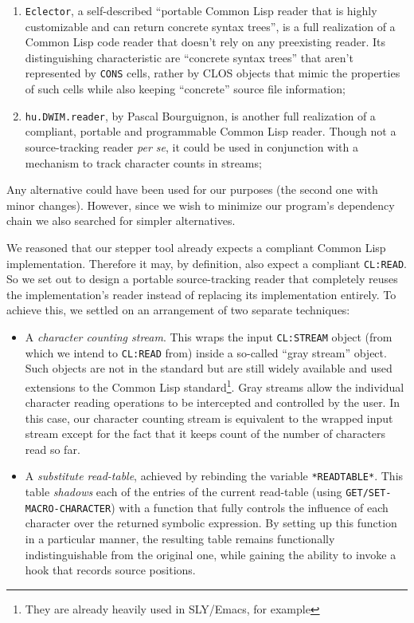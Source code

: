 \documentclass[format=sigconf]{acmart}
\begin{document}
\begin{enumerate}
\item \texttt{Eclector}\cite{eclector}, a self-described ``portable
  Common Lisp reader that is highly customizable and can return
  concrete syntax trees'', is a full realization of a Common Lisp code
  reader that doesn't rely on any preexisting reader.  Its
  distinguishing characteristic are ``concrete syntax trees'' that
  aren't represented by \texttt{CONS} cells, rather by CLOS objects
  that mimic the properties of such cells while also keeping
  ``concrete'' source file information;

\item \texttt{hu.DWIM.reader}\cite{bourguignon-reader}, by Pascal
  Bourguignon, is another full realization of a compliant, portable
  and programmable Common Lisp reader.  Though not a source-tracking
  reader \emph{per se}, it could be used in conjunction with a
  mechanism to track character counts in streams;
\end{enumerate}

Any alternative could have been used for our purposes (the second one
with minor changes).  However, since we wish to minimize our program's
dependency chain we also searched for simpler alternatives.

We reasoned that our stepper tool already expects a compliant Common
Lisp implementation.  Therefore it may, by definition, also expect a
compliant \texttt{CL:READ}.  So we set out to design a portable
source-tracking reader that completely reuses the implementation's
reader instead of replacing its implementation entirely.  To achieve
this, we settled on an arrangement of two separate techniques:

\begin{itemize}
\item A \emph{character counting stream}.  This wraps the input
  \texttt{CL:STREAM} object (from which we intend to \texttt{CL:READ}
  from) inside a so-called ``gray stream'' object.  Such objects are
  not in the standard but are still widely available and used
  extensions to the Common Lisp standard\footnote{They are already
    heavily used in SLY/Emacs, for example}.  Gray streams allow the
  individual character reading operations to be intercepted and
  controlled by the user.  In this case, our character counting stream
  is equivalent to the wrapped input stream except for the fact that
  it keeps count of the number of characters read so far.
  
\item A \emph{substitute read-table}, achieved by rebinding the
  variable \texttt{*READTABLE*}.  This table \emph{shadows} each of
  the entries of the current read-table (using
  \texttt{GET/SET-MACRO-CHARACTER}) with a function that fully
  controls the influence of each character over the returned symbolic
  expression.  By setting up this function in a particular manner, the
  resulting table remains functionally indistinguishable from the
  original one, while gaining the ability to invoke a hook that
  records source positions.
\end{itemize}
\end{document}
